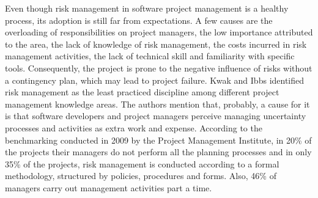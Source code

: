 Even though risk management in software project management is a healthy process, its adoption is still far from expectations. A few causes are the overloading of responsibilities on project managers, the low importance attributed to the area, the lack of knowledge of risk management, the costs incurred in risk management activities, the lack of technical skill and familiarity with specific tools. Consequently, the project is prone to the negative influence of risks without a contingency plan, which may lead to project failure. Kwak and Ibbs \cite{kwak2000calculating} identified risk management as the least practiced discipline among different project management knowledge areas. The authors mention that, probably, a cause for it is that software developers and project managers perceive managing uncertainty processes and activities as extra work and expense. According to the benchmarking conducted in 2009 by the Project Management Institute, in 20\% of the projects their managers do not perform all the planning processes and in only 35\% of the projects, risk management is conducted according to a formal methodology, structured by policies, procedures and forms. Also, 46\% of managers carry out management activities part a time.

